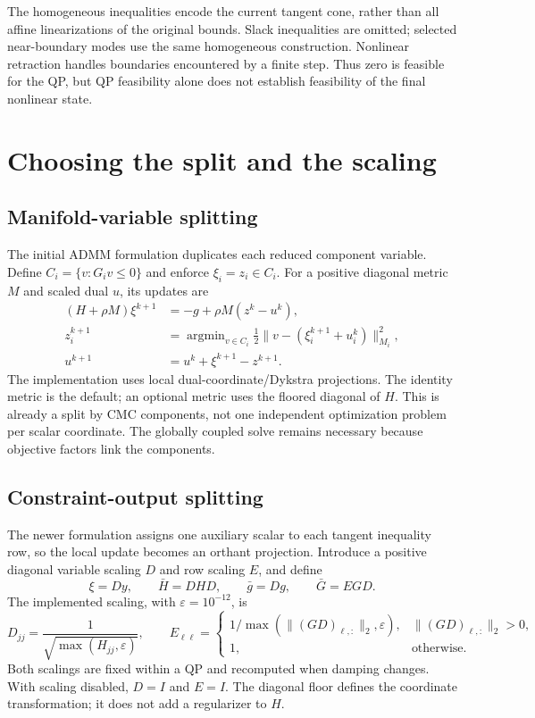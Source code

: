 \documentclass[11pt,letterpaper]{article}
\begin{document}
The homogeneous inequalities encode the current tangent cone, rather than all
affine linearizations of the original bounds. Slack inequalities are omitted;
selected near-boundary modes use the same homogeneous construction. Nonlinear
retraction handles boundaries encountered by a finite step. Thus zero is
feasible for the QP, but QP feasibility alone does not establish feasibility
of the final nonlinear state.

\newpage
\section{Choosing the split and the scaling}
\subsection{Manifold-variable splitting}
The initial ADMM formulation duplicates each reduced component variable.
Define $C_i=\{v:G_i v\leq0\}$ and enforce $\xi_i=z_i\in C_i$.
For a positive diagonal metric $M$ and scaled dual $u$, its updates are
\begin{align}
  (H+\rho M)\xi^{k+1}&=-g+\rho M(z^k-u^k),\label{eq:point}\\
  z_i^{k+1}&=\mathop{\arg\min}_{v\in C_i}
       \tfrac12\|v-(\xi_i^{k+1}+u_i^k)\|_{M_i}^2,\nonumber\\
  u^{k+1}&=u^k+\xi^{k+1}-z^{k+1}.\nonumber
\end{align}
The implementation uses local dual-coordinate/Dykstra projections. The
identity metric is the default; an optional metric uses the floored diagonal
of $H$. This is already a split by CMC components, not one independent
optimization problem per scalar coordinate. The globally coupled solve
remains necessary because objective factors link the components.

\subsection{Constraint-output splitting}
The newer formulation assigns one auxiliary scalar to each tangent inequality
row, so the local update becomes an orthant projection. Introduce a positive
diagonal variable scaling $D$ and row scaling $E$, and define
\begin{equation}
  \xi=Dy,\qquad \bar H=DHD,\qquad \bar g=Dg,\qquad \bar G=EGD.
  \label{eq:scaled}
\end{equation}
The implemented scaling, with $\varepsilon=10^{-12}$, is
\begin{equation}
  D_{jj}=\frac{1}{\sqrt{\max(H_{jj},\varepsilon)}},\qquad
  E_{\ell\ell}=\begin{cases}
    1/\max(\|(GD)_{\ell,:}\|_2,\varepsilon),
      &\|(GD)_{\ell,:}\|_2>0,\\
    1,&\text{otherwise}.
  \end{cases}
  \label{eq:scales}
\end{equation}
Both scalings are fixed within a QP and recomputed when damping changes.
With scaling disabled, $D=I$ and $E=I$. The diagonal floor defines the
coordinate transformation; it does not add a regularizer to $H$.
\end{document}
